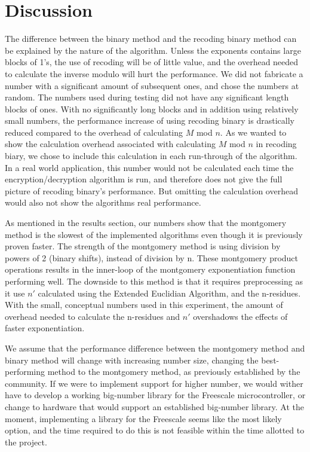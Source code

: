 \documentclass[twocolumn]{IEEEtran}
\begin{document}
\section{Discussion}
The difference between the binary method and the recoding binary method can be explained by the nature of the algorithm. Unless the exponents contains large blocks of 1’s, the use of recoding will be of little value, and the overhead needed to calculate the inverse modulo will hurt the performance. We did not fabricate a number with a significant amount of subsequent ones, and chose the numbers at random. The numbers used during testing did not have any significant length blocks of ones. With no significantly long blocks and in addition using relatively small numbers, the performance increase of using recoding binary is drastically reduced compared to the overhead of calculating $M$ mod $n$. As we wanted to show the calculation overhead associated with calculating $M$ mod $n$ in recoding biary, we chose to include this calculation in each run-through of the algorithm. In a real world application, this number would not be calculated each time the encryption/decryption algorithm is run, and therefore does not give the full picture of recoding binary's performance. But omitting the calculation overhead would also not show the algorithms real performance.

As mentioned in the results section, our numbers show that the montgomery method is the slowest of the implemented algorithms even though it is previously proven faster. The strength of the montgomery method is using division by powers of 2 (binary shifts), instead of division by n. These montgomery product operations results in the inner-loop of the montgomery exponentiation function performing well. The downside to this method is that it requires preprocessing as it use $n'$ calculated using the Extended Euclidian Algorithm, and the n-residues. With the small, conceptual numbers used in this experiment, the amount of overhead needed to calculate the n-residues and $n'$ overshadows the effects of faster exponentiation. 

We assume that the performance difference between the montgomery method and binary method will change with increasing number size, changing the best-performing method to the montgomery method, as previously established by the community. If we were to implement support for higher number, we would wither have to develop a working big-number library for the Freescale microcontroller, or change to hardware that would support an established big-number library. At the moment, implementing a library for the Freescale seems like the most likely option, and the time required to do this is not feasible within the time allotted to the project.
\end{document}
